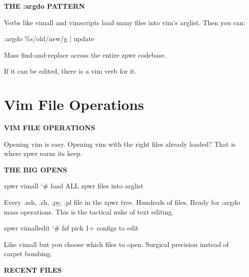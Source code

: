 \documentclass[11pt,a4paper,twoside]{book}
\begin{document}
\vspace{12pt}
{\bfseries\color{neonyellow} THE :argdo PATTERN}\vspace{4pt}

Verbs like vimall and vimscripts load many files into vim's arglist. Then you can:

\begin{codebox}
\color{neongreen}:argdo \%s/old/new/g | update\\
\end{codebox}

Mass find-and-replace across the entire zpwr codebase.

If it can be edited, there is a vim verb for it.


\vspace{16pt}

\section{Vim File Operations}


\vspace{10pt}
{\large\bfseries\color{neoncyan} VIM FILE OPERATIONS}\vspace{6pt}

Opening vim is easy. Opening vim with the right files already loaded? That is where zpwr earns its keep.


\vspace{12pt}
{\bfseries\color{neonyellow} THE BIG OPENS}\vspace{4pt}

\begin{codebox}
\color{neongreen}zpwr vimall             {\char`\#} load ALL zpwr files into arglist\\
\end{codebox}

Every .zsh, .sh, .py, .pl file in the zpwr tree. Hundreds of files. Ready for :argdo mass operations. This is the tactical nuke of text editing.

\begin{codebox}
\color{neongreen}zpwr vimalledit         {\char`\#} fzf pick 1+ configs to edit\\
\end{codebox}

Like vimall but you choose which files to open. Surgical precision instead of carpet bombing.


\vspace{12pt}
{\bfseries\color{neonyellow} RECENT FILES}\vspace{4pt}
\end{document}
